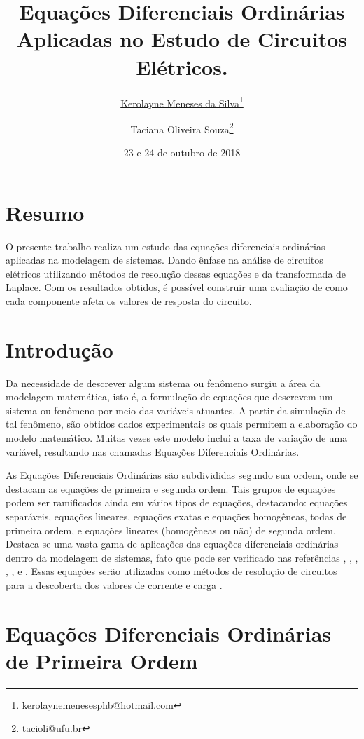 \documentclass[10pt,twoside,a4paper]{article}
\date{23 e 24 de outubro de 2018}
\title{Equações Diferenciais Ordinárias Aplicadas no Estudo de Circuitos Elétricos.}
\author[1]{\underline{Kerolayne Meneses da Silva}\thanks{kerolaynemenesesphb@hotmail.com}}
\author[2]{Taciana Oliveira Souza\thanks{tacioli@ufu.br}}
\affil[1]{FEELT - UFU}
\affil[2]{FAMAT - UFU}
\begin{document}
\inserirtitulo
\linespread{1.5}%

\section{Resumo}
O presente trabalho realiza um estudo das equações diferenciais ordinárias aplicadas na modelagem de sistemas. Dando ênfase na análise de circuitos elétricos utilizando métodos de resolução dessas equações e da transformada de Laplace. Com os resultados obtidos, é possível construir uma avaliação de como cada componente afeta os valores de resposta do circuito.
\section{Introdução} %
Da necessidade de descrever algum sistema ou fenômeno surgiu a área da modelagem matemática, isto é, a formulação de equações que descrevem  um sistema ou fenômeno por meio das variáveis atuantes. A partir da simulação de tal fenômeno, são obtidos dados experimentais os quais permitem a elaboração do modelo matemático. Muitas vezes este modelo inclui a taxa de variação de uma variável, resultando nas chamadas Equações Diferenciais Ordinárias.

As Equações Diferenciais Ordinárias são subdivididas segundo sua ordem, onde se destacam as equações de primeira e segunda ordem. Tais grupos de equações podem ser ramificados ainda em vários tipos de equações, destacando: equações separáveis, equações lineares, equações exatas e equações homogêneas, todas de primeira ordem, e equações lineares (homogêneas ou não) de segunda ordem. Destaca-se uma vasta gama de aplicações das equações diferenciais ordinárias dentro da modelagem de sistemas, fato que pode ser verificado nas referências \cite{BOYCE}, \cite{PACHECO}, \cite{SOUZA}, \cite{SODRE}, \cite{SPIEGEL}, \cite{STEWART} e \cite{ZILL}. Essas equações serão utilizadas como métodos de resolução de circuitos para a descoberta dos valores de corrente e carga .


\section{Equações Diferenciais Ordinárias de Primeira Ordem}
\end{document}
